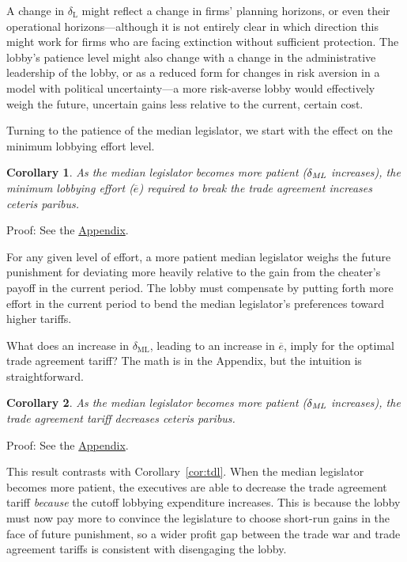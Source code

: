 \documentclass[authoryear, review]{elsarticle}
\newtheorem{corollary}{Corollary}
\newcommand{\ov}{\overline}
\newcommand{\de}{\delta}
\begin{document}
A change in $\de_\text{L}$ might reflect a change in firms' planning horizons, or even their operational horizons---although it is not entirely clear in which direction this might work for firms who are facing extinction without sufficient protection. The lobby's patience level might also change with a change in the administrative leadership of the lobby, or as a reduced form for changes in risk aversion in a model with political uncertainty---a more risk-averse lobby would effectively weigh the future, uncertain gains less relative to the current, certain cost.

Turning to the patience of the median legislator, we start with the effect on the minimum lobbying effort level.

\begin{corollary}
  As the median legislator becomes more patient ($\de_\emph{ML}$ increases), the minimum lobbying effort ($\ov{e}$) required to break the trade agreement increases \emph{ceteris paribus}.
  \label{cor:edm}
\end{corollary}
Proof: See the \hyperlink{Cor_edm}{Appendix}.

\noindent For any given level of effort, a more patient median legislator weighs the future punishment for deviating more heavily relative to the gain from the cheater's payoff in the current period. The lobby must compensate by putting forth more effort in the current period to bend the median legislator's preferences toward higher tariffs.

What does an increase in $\de_\text{ML}$, leading to an increase in $\ov{e}$, imply for the optimal trade agreement tariff? The math is in the Appendix, but the intuition is straightforward.

\begin{corollary}
  As the median legislator becomes more patient ($\de_\emph{ML}$ increases), the trade agreement tariff decreases \emph{ceteris paribus}.
  \label{cor:tdm}
\end{corollary}
Proof: See the \hyperlink{Cor_tdm}{Appendix}.

\noindent This result contrasts with Corollary~\ref{cor:tdl}. When the median legislator becomes more patient, the executives are able to decrease the trade agreement tariff \textit{because} the cutoff lobbying expenditure increases. This is because the lobby must now pay more to convince the legislature to choose short-run gains in the face of future punishment, so a wider profit gap between the trade war and trade agreement tariffs is consistent with disengaging the lobby.
\end{document}
